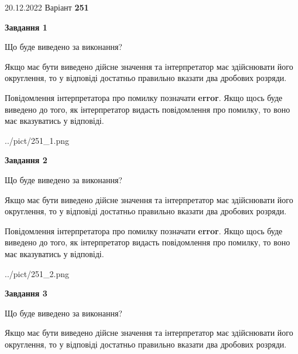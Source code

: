 \documentclass[12pt, ukrainian]{article}
\begin{document}
{20.12.2022 Варіант \No \textbf { 251 }\par}
{
\begin {Large}

{\begin {center}\textbf{Завдання 1}\end {center}}\par
Що буде виведено за виконання? \par

Якщо має бути виведено дійсне значення та інтерпретатор має здійснювати його округлення, 
то у відповіді достатньо правильно вказати два дробових розряди.

Повідомлення інтерпретатора про помилку позначати \textbf{error}.
Якщо щось буде виведено до того, як інтерпретатор видасть повідомлення про помилку, 
то воно має вказуватись у відповіді. \par

\begin{center}
	{../pict/251_1.png}
\end{center}
\newpage

{\begin {center}\textbf{Завдання 2}\end {center}}\par
Що буде виведено за виконання? \par

Якщо має бути виведено дійсне значення та інтерпретатор має здійснювати його округлення, 
то у відповіді достатньо правильно вказати два дробових розряди.

Повідомлення інтерпретатора про помилку позначати \textbf{error}.
Якщо щось буде виведено до того, як інтерпретатор видасть повідомлення про помилку, 
то воно має вказуватись у відповіді. \par

\begin{center}
	{../pict/251_2.png}
\end{center}
\newpage

{\begin {center}\textbf{Завдання 3}\end {center}}\par
Що буде виведено за виконання? \par

Якщо має бути виведено дійсне значення та інтерпретатор має здійснювати його округлення, 
то у відповіді достатньо правильно вказати два дробових розряди.


\end{Large}}
\end{document}
